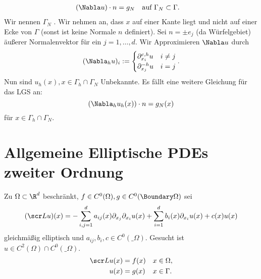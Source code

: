 \begin{ex}
\begin{note}
		\begin{align*}
			(\Nabla u) \cdot n &= g_N
			&& \text{auf $\Gamma_N \subset \Gamma$}.
		\end{align*}
		Wir nennen $\Gamma_N$ .
		Wir nehmen an, dass $x$ auf einer Kante liegt und nicht auf einer Ecke von $\Gamma$ (sonst ist keine Normale $n$ definiert).
		Sei $n = \pm e_j$ (da Würfelgebiet) äußerer Normalenvektor für ein $j = 1, \dotsc, d$.
		Wir Approximieren $\Nabla u$ durch
		\[
			(\Nabla_h u)_i :=
			\begin{cases}
				\partial_{x_i}^{c,h} u & i \neq j \\
				\partial_{x_j}^{-h} u & i = j
			\end{cases}.
		\]
		Nun sind $u_h(x), x \in \Gamma_h \cap \Gamma_N$ Unbekannte.
		Es fällt eine weitere Gleichung für das LGS an:
		\[
			(\Nabla_h u_h(x)) \cdot n = g_N(x)
		\]
		für $x \in \Gamma_h \cap \Gamma_N$.
	\end{note}
\end{ex}


\section{Allgemeine Elliptische PDEs zweiter Ordnung}

\begin{df} \label{2.10}
	Zu $\Omega \subset \R^d$ beschränkt, $f \in C^0(\Omega), g \in C^0(\Boundary \Omega)$ sei
	\begin{equation} \label{eq:2.3}
		(\scr L u)(x)
		= - \sum_{i,j=1}^d a_{ij}(x) \partial_{x_j} \partial_{x_i} u(x)
		+ \sum_{i=1}^d b_i(x) \partial_{x_i} u(x) + c(x) u(x)
	\end{equation}
	gleichmäßig elliptisch und $a_{ij}, b_i, c \in C^0(\_\Omega)$.
	Gesucht ist $u \in C^2(\Omega) \cap C^0(\_\Omega)$.
	\begin{align*}
		\scr L u(x) &= f(x) && \text{$x \in \Omega$}, \\
		u(x) &= g(x) && \text{$x\in\Gamma$}.
	\end{align*}
\end{df}

